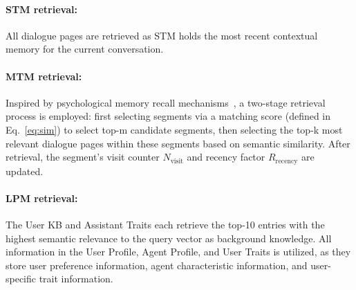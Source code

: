 \documentclass[11pt]{article}
\begin{document}
\paragraph{STM retrieval:} All dialogue pages are retrieved as STM holds the most recent contextual memory for the current conversation. 
\paragraph{MTM retrieval:} Inspired by psychological memory recall mechanisms~\cite{yuan-etal-2024-generative}, a two-stage retrieval process is employed: first selecting segments via a matching score (defined in Eq.~\ref{eq:sim}) to select top-m candidate segments, then selecting the top-k most relevant dialogue pages within these segments based on semantic similarity.
After retrieval, the segment’s visit counter $N_{\text{visit}}$ and recency factor $R_{\text{recency}}$ are updated. 
\paragraph{LPM retrieval:} The User KB and Assistant Traits each retrieve the top-10 entries with the highest semantic relevance to the query vector as background knowledge. All information in the User Profile, Agent Profile, and User Traits is utilized, as they store user preference information, agent characteristic information, and user-specific trait information.
\end{document}
